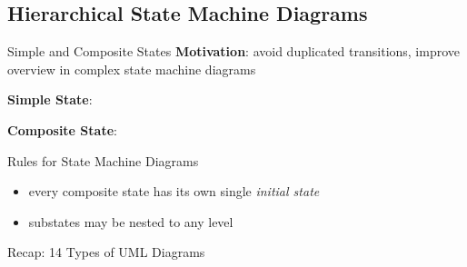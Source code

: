 
\subsection{Hierarchical State Machine Diagrams}
\begin{frame}{\insertsubsection}
	\begin{fancycolumns}
		\begin{definition}{{Simple and Composite States \mysource{\umluserguide}}}
			\textbf{Motivation}: avoid duplicated transitions, improve overview in complex state machine diagrams
			
			\textbf{Simple State}:  
			
			\textbf{Composite State}:  
		\end{definition}
		\pause
		\begin{note}{Rules for State Machine Diagrams}
			\begin{itemize}
				\item every composite state has its own single \emph{initial state} 
				\item substates may be nested to any level
			\end{itemize}
		\end{note}
		\nextcolumn
	\end{fancycolumns}
\end{frame}

\begin{frame}{Recap: 14 Types of UML Diagrams\ \mytitlesource{\umlspec}}
\end{frame}

